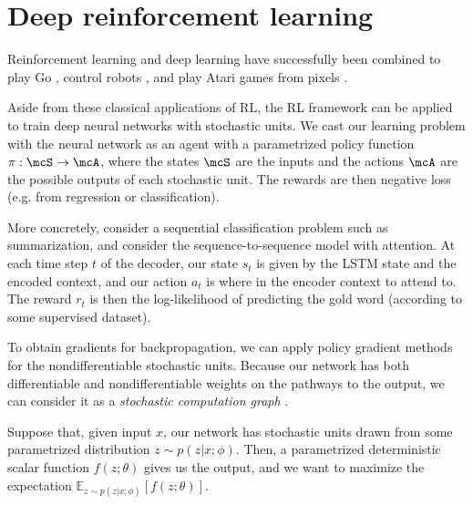 \documentclass[11pt]{report}
\begin{document}


\section{Deep reinforcement learning}

Reinforcement learning and deep learning have successfully been combined to play Go \citep{Silver2016}, 
control robots \citep{Levine2016}, and play Atari games from pixels \citep{deepatari2015}.

Aside from these classical applications of RL, the RL framework can be applied to train deep neural networks with stochastic units. We cast our learning problem with the neural network as an agent with a parametrized policy function $\pi : \mcS \to \mcA$, where the states $\mcS$ are the inputs and the actions $\mcA$ are the possible outputs of each stochastic unit. The rewards are then negative loss (e.g. from regression or classification).

More concretely, consider a sequential classification problem such as summarization, and consider the sequence-to-sequence model with attention. At each time step $t$ of the decoder, our state $s_t$ is given by the LSTM state and the encoded context, and our action $a_t$ is where in the encoder context to attend to. The reward $r_t$ is then the log-likelihood of predicting the gold word (according to some supervised dataset).


To obtain gradients for backpropagation, we can apply policy gradient methods for the nondifferentiable stochastic units. Because our network has both differentiable and nondifferentiable weights on the pathways to the output, we can consider it as a \emph{stochastic computation graph} \citep{schulman2015backprop}.

Suppose that, given input $x$, our network has stochastic units drawn from some parametrized distribution $z \sim p(z | x; \phi)$. Then, a parametrized deterministic scalar function $f(z ; \theta)$ gives us the output, and we want to maximize the expectation $\mathbb{E}_{z \sim p(z | x; \phi)} [ f(z ; \theta) ]$.
\end{document}
